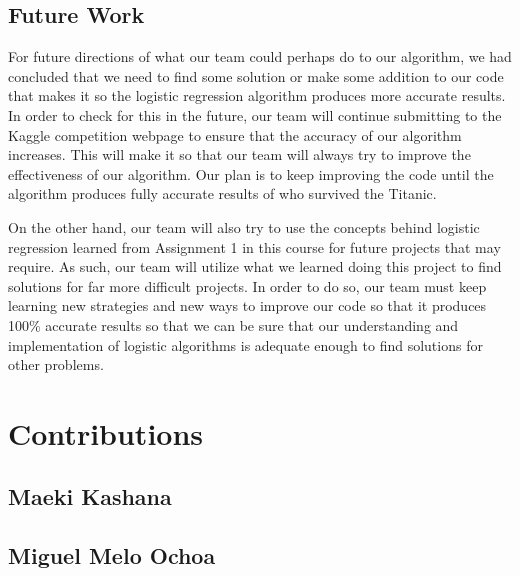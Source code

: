 \documentclass{IEEE}
\begin{document}
\subsection{Future Work}
For future directions of what our team could perhaps do to our algorithm, we had concluded that we need to find some solution or make some addition to our code that makes it so the logistic regression algorithm produces more accurate results. In order to check for this in the future, our team will continue submitting to the Kaggle competition webpage to ensure that the accuracy of our algorithm increases. This will make it so that our team will always try to improve the effectiveness of our algorithm. Our plan is to keep improving the code until the algorithm produces fully accurate results of who survived the Titanic.

On the other hand, our team will also try to use the concepts behind logistic regression learned from Assignment 1 in this course for future projects that may require. As such, our team will utilize what we learned doing this project to find solutions for far more difficult projects. In order to do so, our team must keep learning new strategies and new ways to improve our code so that it produces 100\% accurate results so that we can be sure that our understanding and implementation of logistic algorithms is adequate enough to find solutions for other problems.




\section{Contributions}

\subsection{Maeki Kashana}
\subsection{Miguel Melo Ochoa}
\end{document}
